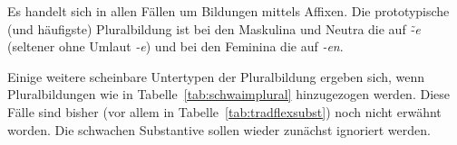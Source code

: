 \begin{table}[!h]
  \centering
  \caption{Übersicht über die Plural-Affixe mit Beispielen}
  \label{tab:plaffixe}
\end{table}

Es handelt sich in allen Fällen um Bildungen mittels Affixen.
Die prototypische (und häufigste) Pluralbildung ist bei den Maskulina und Neutra die auf \textit{\~-e} (seltener ohne Umlaut \textit{-e}) und bei den Feminina die auf \textit{-en}.

Einige weitere scheinbare Untertypen der Pluralbildung ergeben sich, wenn Pluralbildungen wie in Tabelle~\ref{tab:schwaimplural} hinzugezogen werden.
Diese Fälle sind bisher (vor allem in Tabelle~\ref{tab:tradflexsubst}) noch nicht erwähnt worden.
Die schwachen Substantive sollen wieder zunächst ignoriert werden.

\begin{table}[!h]
  \centering
  \caption{Volle und um Schwa reduzierte Plural-Affixe}
  \label{tab:schwaimplural}
\end{table}

